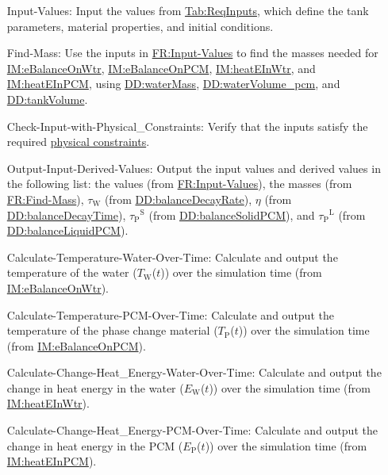 \documentclass[12pt]{article}
\begin{document}
\begin{itemize}
\item[Input-Values:\phantomsection\label{inputValues}]{Input the values from \hyperref[Table:ReqInputs]{Tab:ReqInputs}, which define the tank parameters, material properties, and initial conditions.}
\item[Find-Mass:\phantomsection\label{findMass}]{Use the inputs in \hyperref[inputValues]{FR:Input-Values} to find the masses needed for \hyperref[IM:eBalanceOnWtr]{IM:eBalanceOnWtr}, \hyperref[IM:eBalanceOnPCM]{IM:eBalanceOnPCM}, \hyperref[IM:heatEInWtr]{IM:heatEInWtr}, and \hyperref[IM:heatEInPCM]{IM:heatEInPCM}, using \hyperref[DD:waterMass]{DD:waterMass}, \hyperref[DD:waterVolume.pcm]{DD:waterVolume\_pcm}, and \hyperref[DD:tankVolume]{DD:tankVolume}.}
\item[Check-Input-with-Physical\_Constraints:\phantomsection\label{checkWithPhysConsts}]{Verify that the inputs satisfy the required \hyperref[Sec:DataConstraints]{physical constraints}.}
\item[Output-Input-Derived-Values:\phantomsection\label{outputInputDerivVals}]{Output the input values and derived values in the following list: the values (from \hyperref[inputValues]{FR:Input-Values}), the masses (from \hyperref[findMass]{FR:Find-Mass}), ${τ_{\text{W}}}$ (from \hyperref[DD:balanceDecayRate]{DD:balanceDecayRate}), $η$ (from \hyperref[DD:balanceDecayTime]{DD:balanceDecayTime}), ${{τ_{\text{P}}}^{\text{S}}}$ (from \hyperref[DD:balanceSolidPCM]{DD:balanceSolidPCM}), and ${{τ_{\text{P}}}^{\text{L}}}$ (from \hyperref[DD:balanceLiquidPCM]{DD:balanceLiquidPCM}).}
\item[Calculate-Temperature-Water-Over-Time:\phantomsection\label{calcTempWtrOverTime}]{Calculate and output the temperature of the water (${T_{\text{W}}}$($t$)) over the simulation time (from \hyperref[IM:eBalanceOnWtr]{IM:eBalanceOnWtr}).}
\item[Calculate-Temperature-PCM-Over-Time:\phantomsection\label{calcTempPCMOverTime}]{Calculate and output the temperature of the phase change material (${T_{\text{P}}}$($t$)) over the simulation time (from \hyperref[IM:eBalanceOnPCM]{IM:eBalanceOnPCM}).}
\item[Calculate-Change-Heat\_Energy-Water-Over-Time:\phantomsection\label{calcChgHeatEnergyWtrOverTime}]{Calculate and output the change in heat energy in the water (${E_{\text{W}}}$($t$)) over the simulation time (from \hyperref[IM:heatEInWtr]{IM:heatEInWtr}).}
\item[Calculate-Change-Heat\_Energy-PCM-Over-Time:\phantomsection\label{calcChgHeatEnergyPCMOverTime}]{Calculate and output the change in heat energy in the PCM (${E_{\text{P}}}$($t$)) over the simulation time (from \hyperref[IM:heatEInPCM]{IM:heatEInPCM}).}

\end{itemize}
\end{document}
